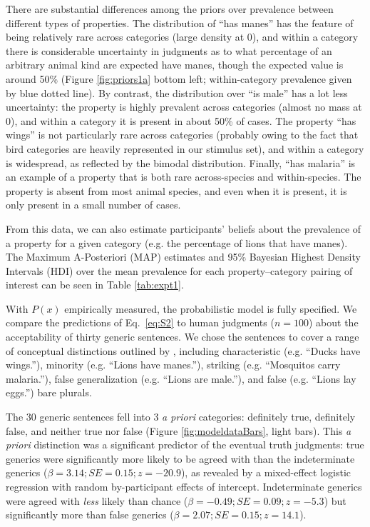 \documentclass[10pt,letterpaper]{article}
\begin{document}
There are substantial differences among the priors over prevalence between different types of properties. 
The distribution of ``has manes'' has the feature of being relatively rare across categories (large density at 0), and within a category there is considerable uncertainty in judgments as to what percentage of an arbitrary animal kind are expected have manes, though the expected value is around 50\% (Figure \ref{fig:priors1a} bottom left; within-category prevalence given by blue dotted line). 
By contrast, the distribution over ``is male'' has a lot less uncertainty: the property is highly prevalent across categories (almost no mass at 0), and within a category it is present in about 50\% of cases.
The property ``has wings'' is not particularly rare across categories (probably owing to the fact that bird categories are heavily represented in our stimulus set), and within a category is widespread, as reflected by the bimodal distribution. 
Finally, ``has malaria'' is an example of a property that is both rare across-species and within-species. 
The property is absent from most animal species, and even when it is present, it is only present in a small number of cases.

From this data, we can also estimate participants' beliefs about the prevalence of a property for a given category (e.g. the percentage of lions that have manes). The Maximum A-Posteriori (MAP) estimates and 95\% Bayesian Highest Density Intervals (HDI) over the mean prevalence for each property--category pairing of interest can be seen in Table \ref{tab:expt1}. 

With $P(x)$ empirically measured, the probabilistic model is fully specified. 
We compare the predictions of Eq.~\ref{eq:S2} to human judgments ($n=100$) about the acceptability of thirty generic sentences. 
We chose the sentences to cover a range of conceptual distinctions outlined by , including characteristic (e.g. ``Ducks have wings.''), minority (e.g. ``Lions have manes.''), striking (e.g. ``Mosquitos carry malaria.''), false generalization (e.g. ``Lions are male.''), and false (e.g. ``Lions lay eggs.'') bare plurals.

The 30 generic sentences fell into 3 \emph{a priori} categories: definitely true, definitely false, and neither true nor false (Figure \ref{fig:modeldataBars}, light bars). 
This \emph{a priori} distinction was a significant predictor of the eventual truth judgments: true generics were significantly more likely to be agreed with than the indeterminate generics ($\beta = 3.14; SE = 0.15; z = -20.9$), as revealed by a mixed-effect logistic regression with random by-participant effects of intercept.
Indeterminate generics were agreed with \emph{less} likely than chance ($\beta = -0.49; SE = 0.09; z = -5.3$) but significantly more than false generics ($\beta = 2.07; SE = 0.15; z = 14.1$).
\end{document}
